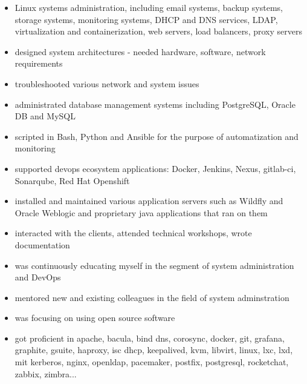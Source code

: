\documentclass{cv}
\begin{document}
\begin{itemize}
    \setlength\itemsep{0.1cm}
    \item Linux systems administration, including email systems, backup systems, storage systems, monitoring systems, DHCP and DNS services, LDAP, virtualization and containerization, web servers, load balancers, proxy servers
    \item designed system architectures - needed hardware, software, network requirements
    \item troubleshooted various network and system issues 
    \item administrated database management systems including PostgreSQL, Oracle DB and MySQL
    \item scripted in Bash, Python and Ansible for the purpose of automatization and monitoring
    \item supported devops ecosystem applications: Docker, Jenkins, Nexus, gitlab-ci, Sonarqube, Red Hat Openshift
    \item installed and maintained various application servers such as Wildfly and Oracle Weblogic and proprietary java applications that ran on them
    \item interacted with the clients, attended technical workshops, wrote documentation
    \item was continuously educating myself in the segment of system administration and DevOps
    \item mentored new and existing colleagues in the field of system adminstration
    \item was focusing on using open source software 
    \item got proficient in apache, bacula, bind dns, corosync, docker, git, grafana, graphite, gsuite, haproxy, isc dhcp, keepalived, kvm, libvirt, linux, lxc, lxd, mit kerberos, nginx, openldap, pacemaker, postfix, postgresql, rocketchat, zabbix, zimbra...
\end{itemize}
\end{document}
